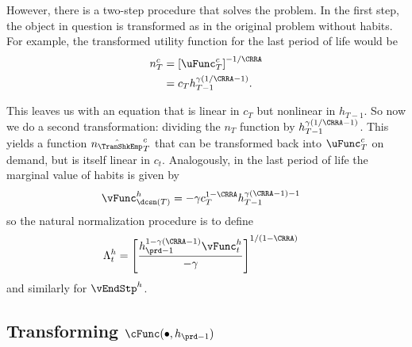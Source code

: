 \documentclass[\econtexRoot/SolvingMicroDSOPs]{subfiles}
\begin{document}
However, there is a two-step procedure that solves the problem.  In
the first step, the object in question is transformed as in the
original problem without habits.  For example, the transformed utility
function for the last period of life would be
\begin{equation}\begin{gathered}\begin{aligned}
  n_{T}^c  & = \left[\uFunc^{c}_{T}\right]^{-1/\CRRA}
  \\        & = c_{T}h_{T-1}^{\gamma(1/\CRRA-1)}.
\end{aligned}\end{gathered}\end{equation}

This leaves us with an equation that is linear in $c_{T}$ but
nonlinear in $h_{T-1}$.  So now we do a second transformation:
dividing the $n_{T}$ function by $h_{T-1}^{\gamma(1/\CRRA-1)}$.  This
yields a function $\hat{n_{\TranShkEmp}}_{T}^{c}$ that can be transformed back into
$\uFunc^{c}_{T}$ on demand, but is itself linear in $c_{t}.$  Analogously,
in the last period of life the marginal value of habits is given by
\begin{equation*}\begin{gathered}\begin{aligned}
  \vFunc_{\dcsn(T)}^{h}  & = -\gamma c_{T}^{1-\CRRA}h_{T-1}^{\gamma(\CRRA-1)-1}
\end{aligned}\end{gathered}\end{equation*}
so the natural normalization procedure is to define
\begin{equation}\begin{gathered}\begin{aligned}
  \Lambda_{t}^{h}
  & =                           \left[\frac{h_{\prd-1}^{1-\gamma(\CRRA-1)}\vFunc_{t}^{h}}{-\gamma}\right]^{1/(1-\CRRA)}
\end{aligned}\end{gathered}\end{equation}
and similarly for $\vEndStp^{h}$.


\hypertarget{Transforming-cFunc}{}
\subsection{Transforming $\cFunc(\bullet,h_{\prd-1})$}
\end{document}
